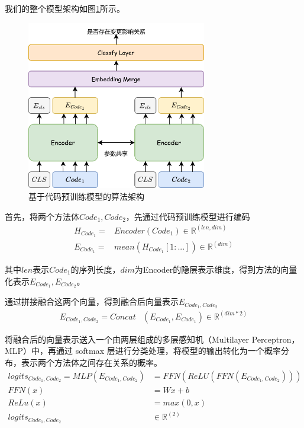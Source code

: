 我们的整个模型架构如图\ref{1_code_bert_overall}所示。
\vspace{0mm}
\begin{figure}[h]
\centering
\includegraphics[width = 0.70\textwidth]{figures/1_code_bert_overall.png}
\caption{基于代码预训练模型的算法架构}
\label{1_code_bert_overall}
\end{figure}


首先，将两个方法体$ Code_1, Code_2$，先通过代码预训练模型进行编码
\begin{align}
H_{Code_1}=&Encoder(Code_1) \in \mathbb{R}^{(len,dim)} \\
E_{Code_1}=&mean(H_{Code_1}[1:...]) \in \mathbb{R}^{(dim)}
\end{align}

其中$len$表示$Code_1$的序列长度，$dim$为Encoder的隐层表示维度，得到方法的向量化表示$ E_{Code_1}, E_{Code_2}$。

通过拼接融合这两个向量，得到融合后向量表示$E_{Code_1,Code_2}$
\begin{align}
E_{Code_1,Code_2}=Concat& (E_{Code_1},E_{Code_1})\in \mathbb{R}^{(dim*2)} 
\end{align}

将融合后的向量表示送入一个由两层组成的多层感知机（Multilayer Perceptron，MLP）中，再通过 softmax 层进行分类处理，将模型的输出转化为一个概率分布，表示两个方法体之间存在关系的概率。
\begin{align}
logits_{Code_1,Code_2}=MLP(E_{Code_1,Code_2})&=FFN(ReLU(FFN(E_{Code_1,Code_2}))) \\
FFN(x)&=Wx+b\\
ReLu(x)&=max(0,x)\\
logits_{Code_1,Code_2}& \in \mathbb{R}^{(2)}
\end{align}

